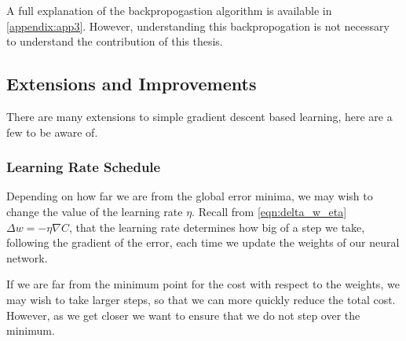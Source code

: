 A full explanation of the backpropogastion algorithm is available in \autoref{appendix:app3}. However, understanding this backpropogation is not necessary to understand the contribution of this thesis.


\subsection{Extensions and Improvements}
There are many extensions to simple gradient descent based learning, here are a few to be aware of.
\subsubsection{Learning Rate Schedule}
\label{sec:lr_sch}
Depending on how far we are from the global error minima, we may wish to change the value of the learning rate $\eta$. Recall from \autoref{eqn:delta_w_eta} $\Delta w = -\eta \nabla C$, that the learning rate determines how big of a step we take, following the gradient of the error, each time we update the weights of our neural network.

If we are far from the minimum point for the cost with respect to the weights, we may wish to take larger steps, so that we can more quickly reduce the total cost. However, as we get closer we want to ensure that we do not step over the minimum.

